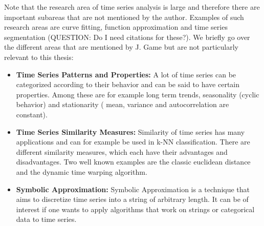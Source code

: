 Note that the research area of time series analysis is large and therefore there are important subareas that are not mentioned by the author. Examples of such research areas are curve fitting, function approximation and time series segmentation (QUESTION: Do I need citations for these?). We briefly go over the different areas that are mentioned by J. Game but are not particularly relevant to this thesis:

\begin{itemize}
	\item \textbf{Time Series Patterns and Properties:} A lot of time series can be categorized according to their behavior and can be said to have certain properties. Among these are for example long term trends, seasonality (cyclic behavior) and stationarity ( mean, variance and autocorrelation are constant).
	\item \textbf{Time Series Similarity Measures:} Similarity of time series has many applications and can for example be used in k-NN classification. There are different similarity measures, which each have their advantages and disadvantages. Two well known examples are the classic euclidean distance and the dynamic time warping algorithm.
	\item \textbf{Symbolic Approximation:} Symbolic Approximation is a technique that aims to discretize time series into a string of arbitrary length. It can be of interest if one wants to apply algorithms that work on strings or categorical data to time series.
\end{itemize}


